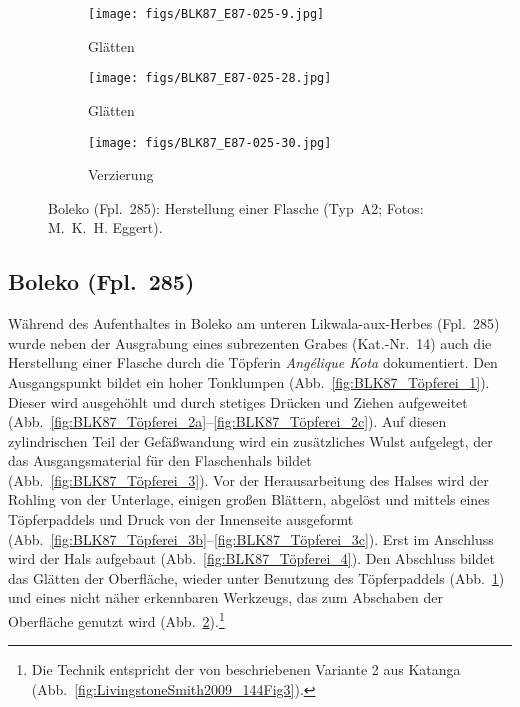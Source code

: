 \begin{figure*}[p]
\begin{subfigure}[t]{0.32\textwidth}
		\centering
		\texttt{[image: figs/BLK87\_E87-025-9.jpg]}
		\caption{Glätten}
		\label{fig:BLK87_Töpferei_5}
	\end{subfigure}
	\begin{subfigure}[t]{0.32\textwidth}
		\centering
		\texttt{[image: figs/BLK87\_E87-025-28.jpg]}
		\caption{Glätten}
		\label{fig:BLK87_Töpferei_6}
	\end{subfigure}
	\begin{subfigure}[t]{0.32\textwidth}
		\centering
		\texttt{[image: figs/BLK87\_E87-025-30.jpg]}
		\caption{Verzierung}
		\label{fig:BLK87_Töpferei_7}
	\end{subfigure}
	\caption{Boleko (Fpl.~285): Herstellung einer Flasche (Typ~A2; Fotos: M.~K.~H. Eggert).}
	\label{fig:BLK87_Töpferei}
\end{figure*}

\subsection*{Boleko (Fpl.~285)}\label{sec:BLK_Herstellung}

Während des Aufenthaltes in Boleko am unteren Likwala-aux-Herbes (Fpl.~285) wurde neben der Ausgrabung eines subrezenten Grabes (Kat.-Nr.~14) auch die Herstellung einer Flasche durch die Töpferin \textit{Angélique Kota} dokumentiert. Den Ausgangspunkt bildet ein hoher Tonklumpen (Abb.~\ref{fig:BLK87_Töpferei_1}). Dieser wird ausgehöhlt und durch stetiges Drücken und Ziehen aufgeweitet (Abb.~\ref{fig:BLK87_Töpferei_2a}--\ref{fig:BLK87_Töpferei_2c}). Auf diesen zylindrischen Teil der Gefäßwandung wird ein zusätzliches Wulst aufgelegt, der das Ausgangsmaterial für den Flaschenhals bildet (Abb.~\ref{fig:BLK87_Töpferei_3}). Vor der Herausarbeitung des Halses wird der Rohling von der Unterlage, einigen großen Blättern, abgelöst und mittels eines Töpferpaddels und Druck von der Innenseite ausgeformt (Abb.~\ref{fig:BLK87_Töpferei_3b}--\ref{fig:BLK87_Töpferei_3c}). Erst im Anschluss wird der Hals aufgebaut (Abb.~\ref{fig:BLK87_Töpferei_4}). Den Abschluss bildet das Glätten der Oberfläche, wieder unter Benutzung des Töpferpaddels (Abb.~\ref{fig:BLK87_Töpferei_5}) und eines nicht näher erkennbaren Werkzeugs, das zum Abschaben der Oberfläche genutzt wird (Abb.~\ref{fig:BLK87_Töpferei_6}).\footnote{Die Technik entspricht der von \textcite[144 Abb. 2.A]{LivingstoneSmith.2009} beschriebenen Variante 2 aus Katanga (Abb.~\ref{fig:LivingstoneSmith2009_144Fig3}).}


